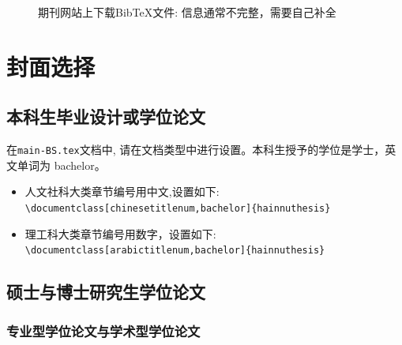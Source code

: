\begin{figure}[hp]
\centering
{} 
\caption{期刊网站上下载BibTeX文件: 信息通常不完整，需要自己补全}
\label{ref-infor-not-complete}
\end{figure}

\section{封面选择}

\subsection{本科生毕业设计或学位论文}
在\lstinline|main-BS.tex|文档中, 请在文档类型中进行设置。本科生授予的学位是学士，英文单词为
bachelor。
\begin{itemize}
\item 人文社科大类章节编号用中文,设置如下:\\
      \lstinline|\documentclass[chinesetitlenum,bachelor]{hainnuthesis}|
\item 理工科大类章节编号用数字，设置如下:\\
      \lstinline|\documentclass[arabictitlenum,bachelor]{hainnuthesis}|
\end{itemize}

\subsection{硕士与博士研究生学位论文}

\subsubsection{专业型学位论文与学术型学位论文}

